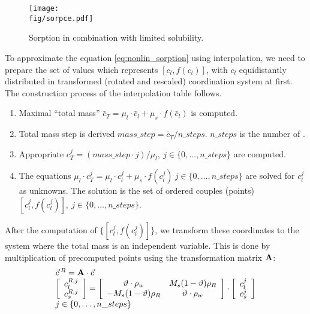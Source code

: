 \begin{figure}[ht!]
 \centering
 \texttt{[image: \\fig/sorpce.pdf]}
 \caption{Sorption in combination with limited solubility.}
 \label{fig:sorpce}
\end{figure}


To approximate the equation \eqref{eq:nonlin_sorption} using interpolation, we need to prepare the set of values 
which represents $[c_l, f(c_l)]$, with $c_l$ equidistantly distributed in transformed (rotated and rescaled) 
coordination system at first. The construction process of the interpolation table follows.
\begin{enumerate}
 \item Maximal ``total mass'' $\bar{c}_T = \mu_l\cdot \bar{c}_l + \mu_s\cdot f(\bar{c}_l)$ is computed.
 \item Total mass step is derived $mass\_step = \bar{c}_T/n\_steps$. $n\_steps$ is the number of
       .
 \item Appropriate $c_T^j = (mass\_step\cdot j)/\mu_l,~j\in \{0,\ldots, n\_steps\}$ are computed. 
 \item The equations $\mu_l \cdot c_T^j = \mu_l\cdot c_l^j + \mu_s\cdot f(c_l^j)~j\in \{0,\ldots, n\_steps\}$ are solved 
       for $c_l^j$ as unknowns. The solution is the set of ordered couples (points) 
       $[c_l^j,f(c_l^j)],~j\in\{0,\ldots,n\_steps\}$.
\end{enumerate}
After the computation of $\{[c_l^j,f(c_l^j)]\}$, we transform these coordinates to the system where the total mass is 
an independent variable. This is done by multiplication of precomputed points using the transformation matrix ${\bf A}$:
\begin{equation}
 \begin{array}{l}
  \vec{c}\,^R = {\bf A}\cdot\vec{c}\\
  \left[\begin{array}{c} c_l^{R,j}\\ c_s^{R,j} \end{array}\right] = 
  \left[\begin{array}{cc}
    \vartheta\cdot \rho_w & M_s(1 - \vartheta)\rho_R\\
    -M_s(1 - \vartheta)\rho_R & \vartheta\cdot \rho_w
  \end{array}\right]\cdot
  \left[\begin{array}{c} c_l^j\\ c_s^j \end{array}\right]\\
  j\in\{0,\ldots,n\_steps\}
 \end{array}
 \label{eq:transf_mat}
\end{equation}


